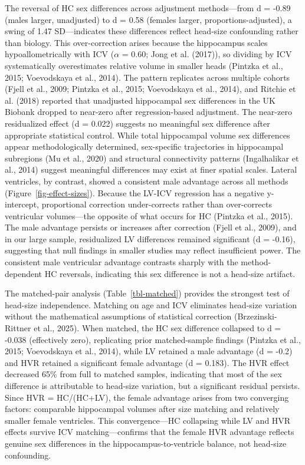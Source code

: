 \documentclass[
]{article}
\begin{document}
The reversal of HC sex differences across adjustment methods---from d =
-0.89 (males larger, unadjusted) to d = 0.58 (females larger,
proportions-adjusted), a swing of 1.47 SD---indicates these differences
reflect head-size confounding rather than biology. This over-correction
arises because the hippocampus scales hypoallometrically with ICV
(\(\alpha\) = 0.60; Jong et al. (2017)), so dividing by ICV
systematically overestimates relative volume in smaller heads (Pintzka
et al., 2015; Voevodskaya et al., 2014). The pattern replicates across
multiple cohorts (Fjell et al., 2009; Pintzka et al., 2015; Voevodskaya
et al., 2014), and Ritchie et al. (2018) reported that unadjusted
hippocampal sex differences in the UK Biobank dropped to near-zero after
regression-based adjustment. The near-zero residualized effect (d =
0.022) suggests no meaningful sex difference after appropriate
statistical control. While total hippocampal volume sex differences
appear methodologically determined, sex-specific trajectories in
hippocampal subregions (Mu et al., 2020) and structural connectivity
patterns (Ingalhalikar et al., 2014) suggest meaningful differences may
exist at finer spatial scales. Lateral ventricles, by contrast, showed a
consistent male advantage across all methods
(Figure~\ref{fig-effect-sizes}). Because the LV-ICV regression has a
negative y-intercept, proportional correction under-corrects rather than
over-corrects ventricular volumes---the opposite of what occurs for HC
(Pintzka et al., 2015). The male advantage persists or increases after
correction (Fjell et al., 2009), and in our large sample, residualized
LV differences remained significant (d = -0.16), suggesting that null
findings in smaller studies may reflect insufficient power. The
consistent male ventricular advantage contrasts sharply with the
method-dependent HC reversals, indicating this sex difference is not a
head-size artifact.

The matched-pair analysis (Table~\ref{tbl-matched}) provides the
strongest test of head-size independence. Matching on age and ICV
eliminates head-size variation without the mathematical assumptions of
statistical correction (Brzezinski-Rittner et al., 2025). When matched,
the HC sex difference collapsed to d = -0.038 (effectively zero),
replicating prior matched-sample findings (Pintzka et al., 2015;
Voevodskaya et al., 2014), while LV retained a male advantage (d = -0.2)
and HVR retained a significant female advantage (d = 0.183). The HVR
effect decreased 65\% from full to matched samples, indicating that most
of the sex difference is attributable to head-size variation, but a
significant residual persists. Since HVR = HC/(HC+LV), the female
advantage arises from two converging factors: comparable hippocampal
volumes after size matching and relatively smaller female ventricles.
This convergence---HC collapsing while LV and HVR effects survive ICV
matching---confirms that the female HVR advantage reflects genuine sex
differences in the hippocampus-to-ventricle balance, not head-size
confounding.
\end{document}
